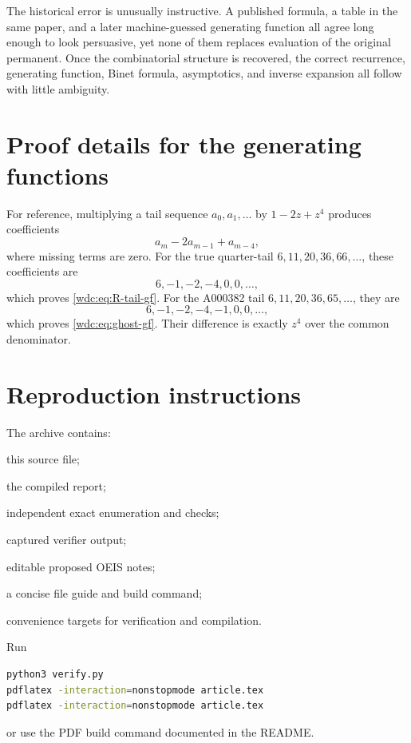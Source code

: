 \documentclass[11pt,letterpaper]{article}
\numberwithin{equation}{section}
\theoremstyle{definition}
\begin{document}
The historical error is unusually instructive.  A published formula, a table
in the same paper, and a later machine-guessed generating function all agree
long enough to look persuasive, yet none of them replaces evaluation of the
original permanent.  Once the combinatorial structure is recovered, the
correct recurrence, generating function, Binet formula, asymptotics, and
inverse expansion all follow with little ambiguity.

\appendix

\section{Proof details for the generating functions}

For reference, multiplying a tail sequence $a_0,a_1,\dots$ by
$1-2z+z^4$ produces coefficients
\[
 a_m-2a_{m-1}+a_{m-4},
\]
where missing terms are zero.  For the true quarter-tail
$6,11,20,36,66,\dots$, these coefficients are
\[
 6,-1,-2,-4,0,0,\dots,
\]
which proves \eqref{wdc:eq:R-tail-gf}.  For the A000382 tail
$6,11,20,36,65,\dots$, they are
\[
 6,-1,-2,-4,-1,0,0,\dots,
\]
which proves \eqref{wdc:eq:ghost-gf}.  Their difference is exactly $z^4$ over the
common denominator.

\section{Reproduction instructions}

The archive contains:
\begin{description}[leftmargin=2.8cm,style=nextline]
\item[\texttt{article.tex}] this source file;
\item[\texttt{article.pdf}] the compiled report;
\item[\texttt{verify.py}] independent exact enumeration and checks;
\item[\texttt{verification\_output.txt}] captured verifier output;
\item[\texttt{oeis\_corrections.txt}] editable proposed OEIS notes;
\item[\texttt{README.md}] a concise file guide and build command;
\item[\texttt{Makefile}] convenience targets for verification and compilation.
\end{description}

Run
\begin{lstlisting}[language=bash]
python3 verify.py
pdflatex -interaction=nonstopmode article.tex
pdflatex -interaction=nonstopmode article.tex
\end{lstlisting}
or use the PDF build command documented in the README.
\end{document}
